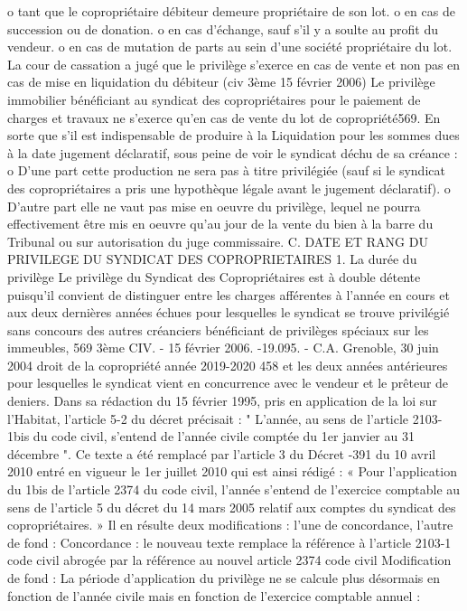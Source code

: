 o tant que le copropriétaire débiteur demeure propriétaire de son lot.
o en cas de succession ou de donation.
o en cas d’échange, sauf s’il y a soulte au profit du vendeur.
o en cas de mutation de parts au sein d’une société propriétaire du lot.
La cour de cassation a jugé que le privilège s’exerce en cas de vente et non pas en cas de mise en liquidation du débiteur (civ 3ème 15 février 2006)
Le privilège immobilier bénéficiant au syndicat des copropriétaires pour le paiement de charges et travaux ne s'exerce qu'en cas de vente du lot de copropriété569.
En sorte que s’il est indispensable de produire à la Liquidation pour les sommes dues à la date jugement déclaratif, sous peine de voir le syndicat déchu de sa créance :
o D’une part cette production ne sera pas à titre privilégiée (sauf si le syndicat des copropriétaires a pris une hypothèque légale avant le jugement déclaratif).
o D’autre part elle ne vaut pas mise en oeuvre du privilège, lequel ne pourra effectivement être mis en oeuvre qu’au jour de la vente du bien à la barre du Tribunal ou sur autorisation du juge commissaire.
C. DATE ET RANG DU PRIVILEGE DU SYNDICAT DES COPROPRIETAIRES
1. La durée du privilège
Le privilège du Syndicat des Copropriétaires est à double détente puisqu'il convient de distinguer entre les charges afférentes à l'année en cours et aux deux dernières années échues pour lesquelles le syndicat se trouve privilégié sans concours des autres créanciers bénéficiant de privilèges spéciaux sur les immeubles,
569 3ème CIV. - 15 février 2006. -19.095. - C.A. Grenoble, 30 juin 2004
droit de la copropriété année 2019-2020
458
et les deux années antérieures pour lesquelles le syndicat vient en concurrence avec le vendeur et le prêteur de deniers.
Dans sa rédaction du 15 février 1995, pris en application de la loi sur l’Habitat, l’article 5-2 du décret précisait :
" L'année, au sens de l'article 2103-1\degres bis du code civil, s'entend de l'année civile comptée du 1er janvier au 31 décembre ".
Ce texte a été remplacé par l’article 3 du Décret -391 du 10 avril 2010 entré en vigueur le 1er juillet 2010 qui est ainsi rédigé :
« Pour l’application du 1\degres bis de l’article 2374 du code civil, l’année s’entend de l’exercice comptable au sens de l’article 5 du décret du 14 mars 2005 relatif aux comptes du syndicat des copropriétaires. »
Il en résulte deux modifications : l’une de concordance, l’autre de fond :
Concordance : le nouveau texte remplace la référence à l’article 2103-1 code civil abrogée par la référence au nouvel article 2374 code civil
Modification de fond : La période d’application du privilège ne se calcule plus désormais en fonction de l’année civile mais en fonction de l’exercice comptable annuel :
